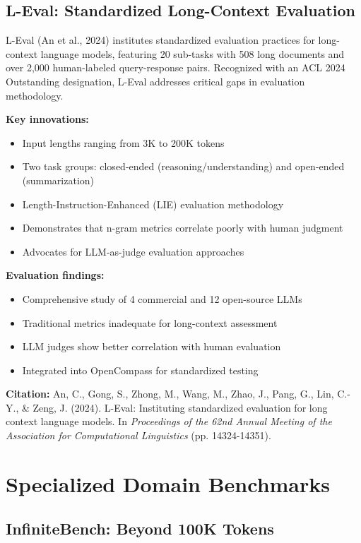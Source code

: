 \documentclass[11pt]{article}
\begin{document}
\subsection{L-Eval: Standardized Long-Context Evaluation}

L-Eval (An et al., 2024) institutes standardized evaluation practices for long-context language models, featuring 20 sub-tasks with 508 long documents and over 2,000 human-labeled query-response pairs. Recognized with an ACL 2024 Outstanding designation, L-Eval addresses critical gaps in evaluation methodology.

\textbf{Key innovations:}
\begin{itemize}[leftmargin=*]
    \item Input lengths ranging from 3K to 200K tokens
    \item Two task groups: closed-ended (reasoning/understanding) and open-ended (summarization)
    \item Length-Instruction-Enhanced (LIE) evaluation methodology
    \item Demonstrates that n-gram metrics correlate poorly with human judgment
    \item Advocates for LLM-as-judge evaluation approaches
\end{itemize}

\textbf{Evaluation findings:}
\begin{itemize}[leftmargin=*]
    \item Comprehensive study of 4 commercial and 12 open-source LLMs
    \item Traditional metrics inadequate for long-context assessment
    \item LLM judges show better correlation with human evaluation
    \item Integrated into OpenCompass for standardized testing
\end{itemize}

\textbf{Citation:} An, C., Gong, S., Zhong, M., Wang, M., Zhao, J., Pang, G., Lin, C.-Y., \& Zeng, J. (2024). L-Eval: Instituting standardized evaluation for long context language models. In \textit{Proceedings of the 62nd Annual Meeting of the Association for Computational Linguistics} (pp. 14324-14351).

\section{Specialized Domain Benchmarks}

\subsection{InfiniteBench: Beyond 100K Tokens}
\end{document}
